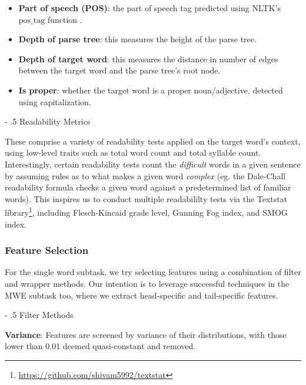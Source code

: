 \documentclass[11pt,a4paper]{article}
\makeatletter
\renewcommand\paragraph{%
    \@startsection{paragraph}{4}{0mm}%
        {-\baselineskip}%
        {.5\baselineskip}%
        {\normalfont\normalsize\bfseries}}
\makeatother
\begin{document}
\begin{itemize}
  \item \textbf{Part of speech (POS)}: the part of speech tag predicted using NLTK's $\text{pos\_tag}$ function \citep{Loper02nltk:the}.
  \item \textbf{Depth of parse tree}: this measures the height of the parse tree.
  \item \textbf{Depth of target word}: this measures the distance in number of edges between the target word and the parse tree's root node.
  \item \textbf{Is proper}: whether the target word is a proper noun/adjective, detected using capitalization.
\end{itemize}

\paragraph{Readability Metrics}

These comprise a variety of readability tests applied on the target word's context, using low-level traits such as total word count and total syllable count. Interestingly, certain readability tests count the \textit{difficult} words in a given sentence by assuming rules as to what makes a given word \textit{complex} (eg. the Dale-Chall readability formula \citep{10.2307/1473169} checks a given word against a predetermined list of familiar words). This inspires us to conduct multiple readabililty tests via the Textstat library\footnote{\url{https://github.com/shivam5992/textstat}}, including Flesch-Kincaid grade level, Gunning Fog index, and SMOG index.

\subsubsection{Feature Selection}

For the single word subtask, we try selecting features using a combination of filter and wrapper methods. Our intention is to leverage successful techniques in the MWE subtask too, where we extract head-specific and tail-specific features.

\paragraph{Filter Methods}

\textbf{Variance}: Features are screened by variance of their distributions, with those lower than 0.01 deemed quasi-constant and removed. 
\end{document}
